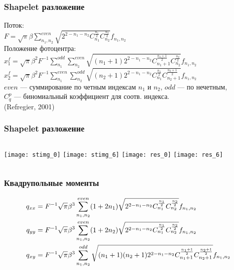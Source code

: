 \begin{frame}
\frametitle{Shapelet разложение}
{\footnotesize Поток:}\\
{\tiny $F = \sqrt{\pi} \beta \sum^{even}_{n_1,n_2} \sqrt{2^{2-n_1-n_2}C^{\frac{n_1}{2}}_{n_1}C^{\frac{n_2}{2}}_{n_2}}f_{n_1,n_2}$}\\[15pt]
{\footnotesize Положение фотоцентра:}\\
{\scriptsize $x_1^f = \sqrt{\pi} \beta^2 F^{-1} \sum^{odd}_{n_1}\sum^{even}_{n_2} \sqrt{(n_1+1)2^{2-n_1-n_2}C^{\frac{n_1+1}{2}}_{n_1+1}C^{\frac{n_2}{2}}_{n_2}}f_{n_1,n_2}$}\\[10pt]
{\scriptsize $x_2^f = \sqrt{\pi} \beta^2 F^{-1} \sum^{even}_{n_1}\sum^{odd}_{n_2} \sqrt{(n_2+1)2^{2-n_1-n_2}C^{\frac{n_1}{2}}_{n_1}C^{\frac{n_2+1}{2}}_{n_2+1}}f_{n_1,n_2}$}\\[15pt]
{\tiny $even$ --- суммирование по четным индексам $n_1$ и $n_2$, $odd$ --- по нечетным,\\ $C^p_q$ --- биномиальный коэффициент для соотв. индекса.}\\[15pt]
{\footnotesize (Refregier, 2001)}
\end{frame}

\begin{frame}
\frametitle{Shapelet разложение}
\begin{center}
\begin{columns}
	\texttt{[image: stimg\_0]}
	\texttt{[image: stimg\_6]}
	\texttt{[image: res\_0]}
	\texttt{[image: res\_6]}
\end{columns}
\end{center}
\end{frame}

\begin{frame}%
\frametitle{Квадрупольные моменты}
{\small
\begin{align*}
 q_{xx} & = F^{-1} \sqrt{\pi} \beta^3 \sum^{even}_{n_1,n_2} (1+2n_1) \sqrt{2^{2-n_1-n_2}C^{\frac{n_1}{2}}_{n_1}C^{\frac{n_2}{2}}_{n_2}}f_{n_1,n_2} \\
 \vspace{5mm}
 q_{yy} & = F^{-1} \sqrt{\pi} \beta^3 \sum^{even}_{n_1,n_2} (1+2n_2) \sqrt{2^{2-n_1-n_2}C^{\frac{n_1}{2}}_{n_1}C^{\frac{n_2}{2}}_{n_2}}f_{n_1,n_2} \\
 \vspace{5mm}
 q_{xy} & = F^{-1} \sqrt{\pi} \beta^3 \sum^{odd}_{n_1,n_2} \sqrt{(n_1+1)(n_2+1)2^{2-n_1-n_2}C^{\frac{n_1+1}{2}}_{n_1+1}C^{\frac{n_2+1}{2}}_{n_2+1}}f_{n_1,n_2}
\end{align*}
}
\end{frame}

